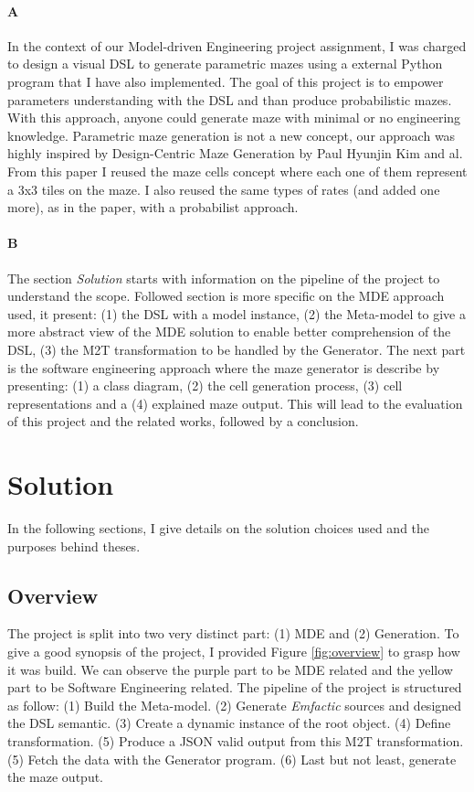 \documentclass[review]{elsarticle}
\begin{document}
\paragraph{A}
In the context of our Model-driven Engineering project assignment, I was charged to design a visual DSL to generate parametric mazes using a external Python program that I have also implemented. The goal of this project is to empower parameters understanding with the DSL and than produce probabilistic mazes. With this approach, anyone could generate maze with minimal or no engineering knowledge. Parametric maze generation is not a new concept, our approach was highly inspired by Design-Centric Maze Generation by Paul Hyunjin Kim and al\cite{kim_design-centric_2019}. From this paper I reused the maze cells concept where each one of them represent a 3x3 tiles on the maze. I also reused the same types of rates (and added one more), as in the paper, with a probabilist approach.

\paragraph{B}
The section \textit{Solution} starts with information on the pipeline of the project to understand the scope. Followed section is more specific on the MDE approach used, it present: (1) the DSL with a model instance, (2) the Meta-model to give a more abstract view of the MDE solution to enable better comprehension of the DSL, (3) the M2T transformation to be handled by the Generator. The next part is the software engineering approach where the maze generator is describe by presenting: (1) a class diagram, (2) the cell generation process, (3) cell representations and a (4) explained maze output. This will lead to the evaluation of this project and the related works, followed by a conclusion.

\section{Solution}
In the following sections, I give details on the solution choices used and the purposes behind theses.

\subsection{Overview}
The project is split into two very distinct part: (1) MDE and (2) Generation. To give a good synopsis of the project, I provided Figure \ref{fig:overview} to grasp how it was build. We can observe the purple part to be MDE related and the yellow part to be Software Engineering related. The pipeline of the project is structured as follow: (1) Build the Meta-model. (2) Generate \textit{Emfactic} sources and designed the DSL semantic. (3) Create a dynamic instance of the root object. (4) Define transformation. (5) Produce a JSON valid output from this M2T transformation. (5) Fetch the data with the Generator program. (6) Last but not least, generate the maze output.
\end{document}
